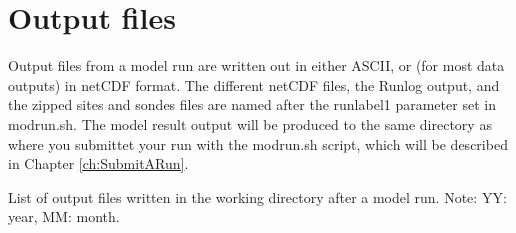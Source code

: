 \chapter{Output files}
\label{ch:output}

Output files from a model run are written out in either ASCII, or
(for most data outputs) in netCDF format. 
The different netCDF files, the Runlog output, and the zipped sites and sondes 
files are named after the runlabel1 parameter set in modrun.sh. 
The model result output will be produced to the same directory as where you submittet 
your run with the modrun.sh script, which will be described in Chapter \ref{ch:SubmitARun}.
 


\begin{table}[h!]
\caption[List of model output files]{List of output files written in the
  working directory after a  model run. 
Note: YY: year, MM: month.}\label{tab:output}
\vspace{0.5cm}


\end{table}
